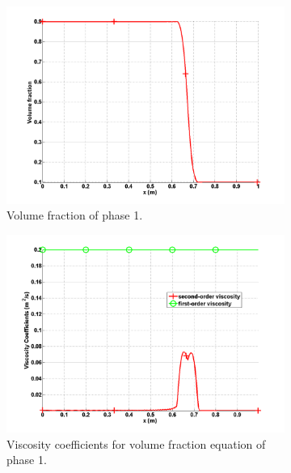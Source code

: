 \begin{figure}[H]
        \centering
        \begin{subfigure}[b]{0.495\textwidth}
                \centering
                \includegraphics[width=\textwidth]{figures/SEM/liquid_volume_fraction.png}
                \caption{Volume fraction of phase 1.}
                \label{fig:vf-liq-7-eqn-sect4}
        \end{subfigure}%
        \begin{subfigure}[b]{0.495\textwidth}
                \centering
                \includegraphics[width=\textwidth]{figures/SEM/liquid_beta.png}
                \caption{Viscosity coefficients for volume fraction equation of phase 1.}
                \label{fig:beta-liq-7-eqn-sect4}
        \end{subfigure}
        \caption{\label{fig:beta-visc-7-sect4}}
\end{figure}
